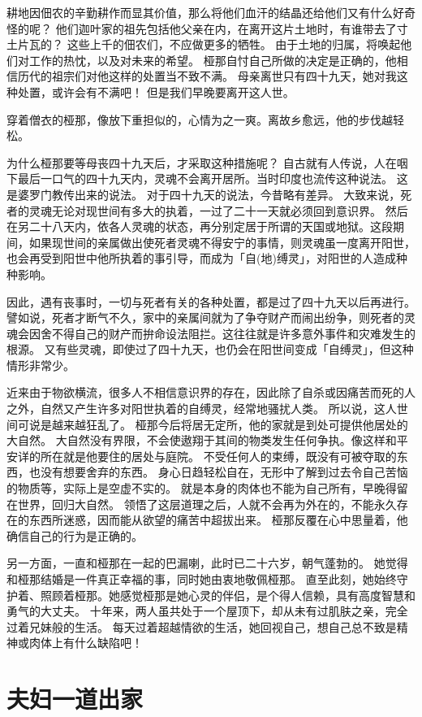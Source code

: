 \documentclass[twoside,openany]{book}
\begin{document}
耕地因佃农的辛勤耕作而显其价值，那么将他们血汗的结晶还给他们又有什么好奇怪的呢？
他们迦叶家的祖先包括他父亲在内，在离开这片土地时，有谁带去了寸土片瓦的？
这些上千的佃农们，不应做更多的牺牲。
由于土地的归属，将唤起他们对工作的热忱，以及对未来的希望。
桠那自忖自己所做的决定是正确的，他相信历代的祖宗们对他这样的处置当不致不满。
母亲离世只有四十九天，她对我这种处置，或许会有不满吧！
但是我们早晚要离开这人世。

穿着僧衣的桠那，像放下重担似的，心情为之一爽。离故乡愈远，他的步伐越轻松。

为什么桠那要等母丧四十九天后，才采取这种措施呢？
自古就有人传说，人在咽下最后一口气的四十九天内，灵魂不会离开居所。当时印度也流传这种说法。
这是婆罗门教传出来的说法。
对于四十九天的说法，今昔略有差异。
大致来说，死者的灵魂无论对现世间有多大的执着，一过了二十一天就必须回到意识界。
然后在另二十八天内，依各人灵魂的状态，再分别定居于所谓的天国或地狱。这段期间，如果现世间的亲属做出使死者灵魂不得安宁的事情，则灵魂虽一度离开阳世，也会再受到阳世中他所执着的事引导，而成为「自(地)缚灵」，对阳世的人造成种种影响。

因此，遇有丧事时，一切与死者有关的各种处置，都是过了四十九天以后再进行。
譬如说，死者才断气不久，家中的亲属间就为了争夺财产而闹出纷争，则死者的灵魂会因舍不得自己的财产而拚命设法阻拦。这往往就是许多意外事件和灾难发生的根源。
又有些灵魂，即使过了四十九天，也仍会在阳世间变成「自缚灵」，但这种情形非常少。

近来由于物欲横流，很多人不相信意识界的存在，因此除了自杀或因痛苦而死的人之外，自然又产生许多对阳世执着的自缚灵，经常地骚扰人类。
所以说，这人世间可说是越来越狂乱了。
桠那今后将居无定所，他的家就是到处可提供他居处的大自然。
大自然没有界限，不会使遨翔于其间的物类发生任何争执。像这样和平安详的所在就是他要住的居处与庭院。
不受任何人的束缚，既没有可被夺取的东西，也没有想要舍弃的东西。
身心日趋轻松自在，无形中了解到过去令自己苦恼的物质等，实际上是空虚不实的。
就是本身的肉体也不能为自己所有，早晚得留在世界，回归大自然。
领悟了这层道理之后，人就不会再为外在的，不能永久存在的东西所迷惑，因而能从欲望的痛苦中超拔出来。
桠那反覆在心中思量着，他确信自己的行为是正确的。

另一方面，一直和桠那在一起的巴漏喇，此时已二十六岁，朝气蓬勃的。
她觉得和桠那结婚是一件真正幸福的事，同时她由衷地敬佩桠那。
直至此刻，她始终守护着、照顾着桠那。她感觉桠那是她心灵的伴侣，是个得人信赖，具有高度智慧和勇气的大丈夫。
十年来，两人虽共处于一个屋顶下，却从未有过肌肤之亲，完全过着兄妹般的生活。
每天过着超越情欲的生活，她回视自己，想自己总不致是精神或肉体上有什么缺陷吧！

\section{夫妇一道出家}\label{sec4.4}
\end{document}
